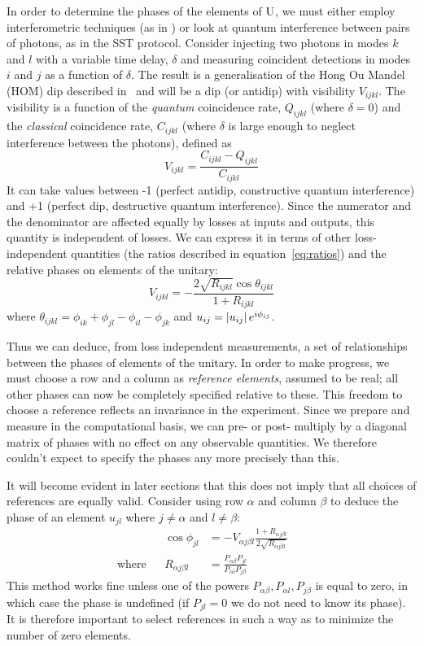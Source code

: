In order to determine the phases of the elements of \(\mathrm{U}\), we must either
employ interferometric techniques (as in \cite{sst-ralph}) or look at quantum
interference between pairs of photons, as in the SST protocol. Consider
injecting two photons in modes \(k\) and \(l\) with a variable time delay,
\(\delta\) and measuring coincident detections in modes \(i\) and \(j\) as a
function of \(\delta\). The result is a generalisation of the Hong Ou Mandel
(HOM) dip described in~\cite{hom} and will be a dip (or antidip) with visibility
\(V_{ijkl}\). The visibility is a function of the \emph{quantum}
coincidence rate, \(Q_{ijkl}\) (where \(\delta=0\)) and the \emph{classical}
coincidence rate, \(C_{ijkl}\) (where \(\delta\) is large enough to neglect
interference between the photons), defined as
\begin{equation}
  V_{ijkl} = \frac{C_{ijkl} - Q_{ijkl}}{C_{ijkl}}
\end{equation}
It can take values between -1 (perfect antidip, constructive quantum
interference) and +1 (perfect dip, destructive quantum interference). Since the
numerator and the denominator are affected equally by losses at inputs and
outputs, this quantity is independent of losses. We can express it in terms of
other loss-independent quantities (the ratios described in
equation~\ref{eq:ratios}) and the relative phases on elements of the unitary:
\begin{equation}
  V_{ijkl} = -\frac{2 \sqrt{R_{ijkl}} \cos \theta_{ijkl}}{1+R_{ijkl}}
\end{equation}
where \(\theta_{ijkl} = \phi_{ik} + \phi_{jl} - \phi_{il} - \phi_{jk}\) and
\(u_{ij} = \left|u_{ij}\right|e^{i\phi_{ij}}\).

Thus we can deduce, from loss independent measurements, a set of relationships
between the phases of elements of the unitary. In order to make progress, we
must choose a row and a column as \emph{reference elements}, assumed to be real;
all other phases can now be completely specified relative to these. This freedom
to choose a reference reflects an invariance in the experiment. Since we prepare
and measure in the computational basis, we can pre- or post- multiply by a
diagonal matrix of phases with no effect on any observable quantities. We
therefore couldn't expect to specify the phases any more precisely than this.

It will become evident in later sections that this does not imply that all
choices of references are equally valid. Consider using row \(\alpha\) and
column \(\beta\) to deduce the phase of an element \(u_{jl}\) where \(j \neq
\alpha\) and \(l \neq \beta\):
\begin{align}
  && \cos{\phi_{jl}} &= - V_{\alpha j \beta l} \frac{1 + R_{\alpha j \beta l}}
    {2 \sqrt{R_{\alpha j \beta l}}} && \\
  \text{where} && R_{\alpha j \beta l} &= \frac{P_{\alpha \beta}
    P_{jl}}{P_{\alpha l} P_{j \beta}} &&
\end{align}
This method works fine unless one of the powers \(P_{\alpha \beta},
P_{\alpha l}, P_{j \beta}\) is equal to zero, in which case the phase is
undefined (if \(P_{jl}=0\) we do not need to know its phase). It is therefore
important to select references in such a way as to minimize the number of zero
elements.

